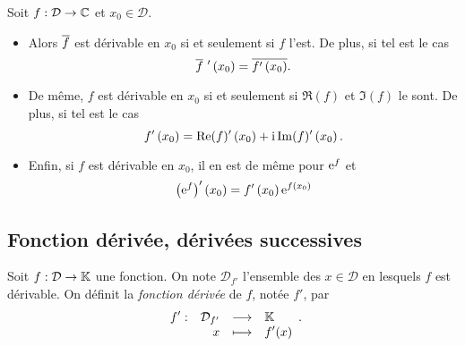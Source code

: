 \documentclass{magnoliaold}
\begin{document}
\begin{proposition}[utile=-3]
Soit $f:\mathcal{D}\to\mathbb{C}$ et $x_0\in\mathcal{D}$.
\begin{itemize}
\item Alors $\overline{f}$ est dérivable en $x_0$ si et seulement si $f$ l'est. De
  plus, si tel est le cas
  \[\conj{f}\ '\p{x_0}=\conj{f'\p{x_0}}.\]
\item De même, $f$ est dérivable en $x_0$ si et seulement si $\Re(f)$ et
  $\Im(f)$ le sont. De plus, si tel est le cas
  \[f'\left(x_0\right)=\mathop{\rm Re}(f)'\left(x_0\right)+{\rm i}\mathop{\rm Im}(f)'\left(x_0\right).\]
\item Enfin, si $f$ est dérivable en $x_0$, il en est de même pour ${\rm e}^f$ et
  \[\left({\rm e}^f\right)'\left(x_0\right)=f'\left(x_0\right){\rm e}^{f\left(x_0\right)}\]
\end{itemize}
\end{proposition}





\subsection{Fonction dérivée, dérivées successives}

\begin{definition}[utile=-3]
Soit $f:\mathcal{D}\to\mathbb{K}$ une fonction. On note $\mathcal{D}_{f'}$
l'ensemble des $x\in\mathcal{D}$ en lesquels $f$ est dérivable.
On définit la \emph{fonction dérivée} de $f$, notée
$f'$, par
\[\begin{array}[t]{lrcl} \displaystyle{f'} : & \displaystyle{\mathcal{D}_{f'}} & \longrightarrow & \displaystyle{\ensuremath{\mathbb{K}}} \\ & \displaystyle{x} & \longmapsto & \displaystyle{f'(x)} \end{array}.\]
\end{definition}

\end{document}
